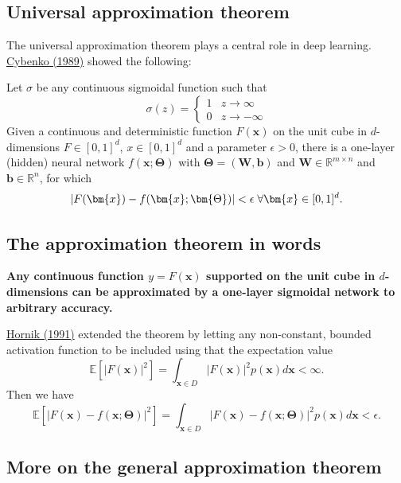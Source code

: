 \documentclass[%
oneside,                 %
final,                   %
10pt]{article}
\begin{document}
\subsection{Universal approximation theorem}

The universal approximation theorem plays a central role in deep
learning.  \href{{https://link.springer.com/article/10.1007/BF02551274}}{Cybenko (1989)} showed
the following:

\begin{block}{}
Let $\sigma$ be any continuous sigmoidal function such that
\[
\sigma(z) = \left\{\begin{array}{cc} 1 & z\rightarrow \infty\\ 0 & z \rightarrow -\infty \end{array}\right.
\]
Given a continuous and deterministic function $F(\bm{x})$ on the unit
cube in $d$-dimensions $F\in [0,1]^d$, $x\in [0,1]^d$ and a parameter
$\epsilon >0$, there is a one-layer (hidden) neural network
$f(\bm{x};\bm{\Theta})$ with $\bm{\Theta}=(\bm{W},\bm{b})$ and $\bm{W}\in
\mathbb{R}^{m\times n}$ and $\bm{b}\in \mathbb{R}^{n}$, for which
\[
\vert F(\bm{x})-f(\bm{x};\bm{\Theta})\vert < \epsilon \hspace{0.1cm} \forall \bm{x}\in[0,1]^d.
\]

\end{block}

\subsection{The approximation theorem in words}

\textbf{Any continuous function $y=F(\bm{x})$ supported on the unit cube in
$d$-dimensions can be approximated by a one-layer sigmoidal network to
arbitrary accuracy.}

\href{{https://www.sciencedirect.com/science/article/abs/pii/089360809190009T}}{Hornik (1991)} extended the theorem by letting any non-constant, bounded activation function to be included using that the expectation value
\[
\mathbb{E}[\vert F(\bm{x})\vert^2] =\int_{\bm{x}\in D} \vert F(\bm{x})\vert^2p(\bm{x})d\bm{x} < \infty.
\]
Then we have
\[
\mathbb{E}[\vert F(\bm{x})-f(\bm{x};\bm{\Theta})\vert^2] =\int_{\bm{x}\in D} \vert F(\bm{x})-f(\bm{x};\bm{\Theta})\vert^2p(\bm{x})d\bm{x} < \epsilon.
\]

\subsection{More on the general approximation theorem}
\end{document}

